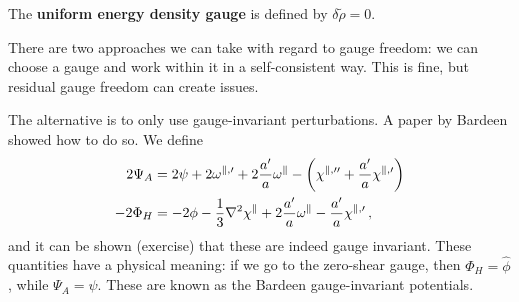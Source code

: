 \documentclass[main.tex]{subfiles}
\begin{document}
The \textbf{uniform energy density gauge} is defined by \(\delta \widetilde{\rho} = 0\). 

There are two approaches we can take with regard to gauge freedom: we can choose a gauge and work within it in a self-consistent way. 
This is fine, but residual gauge freedom can create issues. 

The alternative is to only use gauge-invariant perturbations. 
A paper by Bardeen \cite[]{bardeenGaugeinvariantCosmologicalPerturbations1980a} showed how to do so.
We define 
%
\begin{align}
2 \Psi  _A &= 2 \psi + 2 \omega^{\parallel, \prime} + 2 \frac{a'}{a} \omega^{\parallel} - \qty(\chi^{\parallel, \prime \prime} + \frac{a'}{a} \chi^{\parallel, \prime})  \\
-2 \Phi_H &= -2 \phi - \frac{1}{3} \nabla^2 \chi^{\parallel} + 2 \frac{a'}{a} \omega^{\parallel} - \frac{a'}{a} \chi^{\parallel, \prime}
\,,
\end{align}
%
and it can be shown (exercise) that these are indeed gauge invariant. 
These quantities have a physical meaning: if we go to the zero-shear gauge, then \(\Phi _H = \hat{\phi} \), while \(\Psi _A = \psi \).
These are known as the Bardeen gauge-invariant potentials. 
\end{document}
